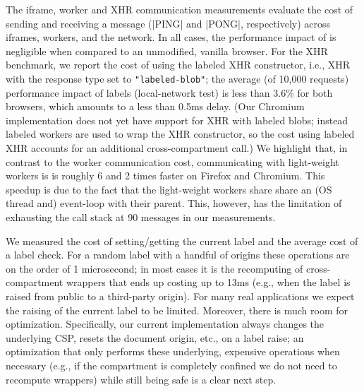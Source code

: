 %
The iframe, worker and XHR communication measurements evaluate the
cost of sending and receiving a message (\js|PING| and \js|PONG|,
respectively) across iframes, workers, and the network.
%
In all cases, the performance impact of \sys{} is negligible when
compared to an unmodified, vanilla browser.
%
For the XHR benchmark, we report the cost of using the labeled XHR
constructor, i.e., XHR with the response type set to
\verb|"labeled-blob"|; the average (of 10,000 requests) performance
impact of labels (local-network test) is less than 3.6\% for both
browsers, which amounts to a less than 0.5ms delay.
%
(Our Chromium implementation does not yet have support for XHR with
labeled blobs; instead labeled workers are used to wrap the XHR
constructor, so the cost using labeled XHR accounts for an additional
cross-compartment call.)
%
We highlight that, in contrast to the worker communication cost,
communicating with light-weight workers is is roughly 6 and 2 times
faster on Firefox and Chromium.
%
This speedup is due to the fact that the light-weight workers share
share an (OS thread and) event-loop with their parent.
%
This, however, has the limitation of exhausting the call stack at 90
messages in our measurements.


We measured the cost of setting/getting the current label and the
average cost of a label check.
%
For a random label with a handful of origins these operations are on
the order of 1 microsecond; in most cases it is the recomputing of
cross-compartment wrappers that ends up costing up to 13ms (e.g., when
the label is raised from public to a third-party origin).
%
For many real applications we expect the raising of the current label
to be limited.
%
Moreover, there is much room for optimization.
%
Specifically, our current implementation always changes the underlying
CSP, resets the document origin, etc., on a label raise;
%
an optimization that only performs these underlying, expensive
operations when necessary (e.g., if the compartment is completely
confined we do not need to recompute wrappers) while still being safe
is a clear next step.
 
